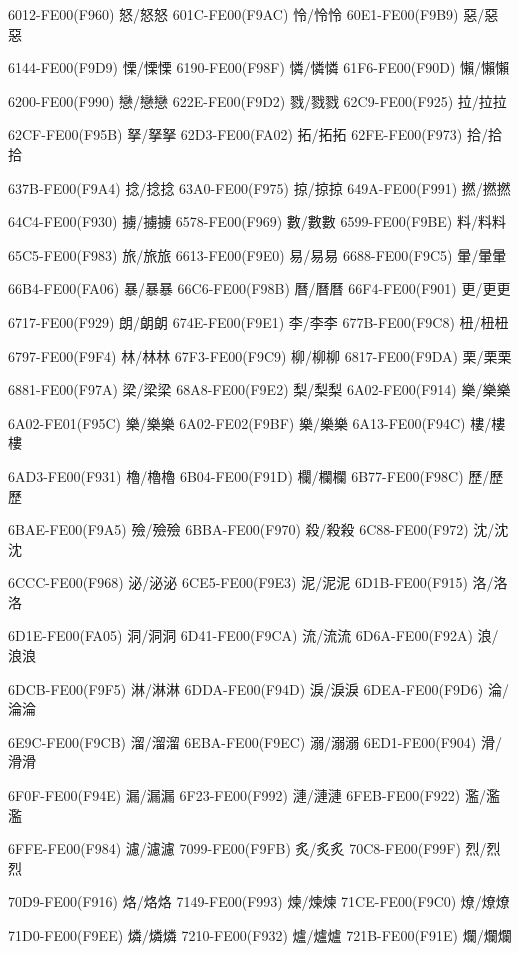 6012-FE00(F960) 怒/怒︀怒 
601C-FE00(F9AC) 怜/怜︀怜 
60E1-FE00(F9B9) 惡/惡︀惡\par
6144-FE00(F9D9) 慄/慄︀慄 
6190-FE00(F98F) 憐/憐︀憐 
61F6-FE00(F90D) 懶/懶︀懶\par
6200-FE00(F990) 戀/戀︀戀 
622E-FE00(F9D2) 戮/戮︀戮 
62C9-FE00(F925) 拉/拉︀拉\par
62CF-FE00(F95B) 拏/拏︀拏 
62D3-FE00(FA02) 拓/拓︀拓 
62FE-FE00(F973) 拾/拾︀拾\par
637B-FE00(F9A4) 捻/捻︀捻 
63A0-FE00(F975) 掠/掠︀掠 
649A-FE00(F991) 撚/撚︀撚\par
64C4-FE00(F930) 擄/擄︀擄 
6578-FE00(F969) 數/數︀數 
6599-FE00(F9BE) 料/料︀料\par
65C5-FE00(F983) 旅/旅︀旅 
6613-FE00(F9E0) 易/易︀易 
6688-FE00(F9C5) 暈/暈︀暈\par
66B4-FE00(FA06) 暴/暴︀暴 
66C6-FE00(F98B) 曆/曆︀曆 
66F4-FE00(F901) 更/更︀更\par
6717-FE00(F929) 朗/朗︀朗 
674E-FE00(F9E1) 李/李︀李 
677B-FE00(F9C8) 杻/杻︀杻\par
6797-FE00(F9F4) 林/林︀林 
67F3-FE00(F9C9) 柳/柳︀柳 
6817-FE00(F9DA) 栗/栗︀栗\par
6881-FE00(F97A) 梁/梁︀梁 
68A8-FE00(F9E2) 梨/梨︀梨 
6A02-FE00(F914) 樂/樂︀樂\par
6A02-FE01(F95C) 樂/樂︁樂 
6A02-FE02(F9BF) 樂/樂︂樂 
6A13-FE00(F94C) 樓/樓︀樓\par
6AD3-FE00(F931) 櫓/櫓︀櫓 
6B04-FE00(F91D) 欄/欄︀欄 
6B77-FE00(F98C) 歷/歷︀歷\par
6BAE-FE00(F9A5) 殮/殮︀殮 
6BBA-FE00(F970) 殺/殺︀殺 
6C88-FE00(F972) 沈/沈︀沈\par
6CCC-FE00(F968) 泌/泌︀泌 
6CE5-FE00(F9E3) 泥/泥︀泥 
6D1B-FE00(F915) 洛/洛︀洛\par
6D1E-FE00(FA05) 洞/洞︀洞 
6D41-FE00(F9CA) 流/流︀流 
6D6A-FE00(F92A) 浪/浪︀浪\par
6DCB-FE00(F9F5) 淋/淋︀淋 
6DDA-FE00(F94D) 淚/淚︀淚 
6DEA-FE00(F9D6) 淪/淪︀淪\par
6E9C-FE00(F9CB) 溜/溜︀溜 
6EBA-FE00(F9EC) 溺/溺︀溺 
6ED1-FE00(F904) 滑/滑︀滑\par
6F0F-FE00(F94E) 漏/漏︀漏 
6F23-FE00(F992) 漣/漣︀漣 
6FEB-FE00(F922) 濫/濫︀濫\par
6FFE-FE00(F984) 濾/濾︀濾 
7099-FE00(F9FB) 炙/炙︀炙 
70C8-FE00(F99F) 烈/烈︀烈\par
70D9-FE00(F916) 烙/烙︀烙 
7149-FE00(F993) 煉/煉︀煉 
71CE-FE00(F9C0) 燎/燎︀燎\par
71D0-FE00(F9EE) 燐/燐︀燐 
7210-FE00(F932) 爐/爐︀爐 
721B-FE00(F91E) 爛/爛︀爛\par
